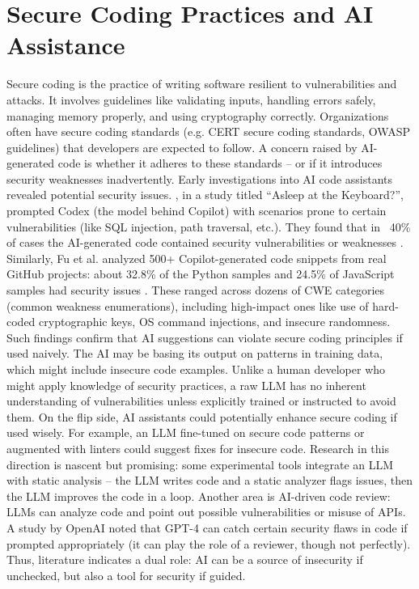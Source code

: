 \section{Secure Coding Practices and AI Assistance}
\label{sec:secure-coding-practices-and-ai-assistance}
Secure coding is the practice of writing software resilient to vulnerabilities and attacks. It involves guidelines like validating inputs, handling errors safely, managing memory properly, and using cryptography correctly. Organizations often have secure coding standards (e.g. CERT secure coding standards, OWASP guidelines) that developers are expected to follow. A concern raised by AI-generated code is whether it adheres to these standards – or if it introduces security weaknesses inadvertently.
Early investigations into AI code assistants revealed potential security issues. \autocite{Pearce2022}, in a study titled “Asleep at the Keyboard?”, prompted Codex (the model behind Copilot) with scenarios prone to certain vulnerabilities (like SQL injection, path traversal, etc.). They found that in ~40\% of cases the AI-generated code contained security vulnerabilities or weaknesses \autocite{Pearce2022}. Similarly, Fu et al. analyzed 500+ Copilot-generated code snippets from real GitHub projects: about 32.8\% of the Python samples and 24.5\% of JavaScript samples had security issues \autocite{Fu2023}. These ranged across dozens of CWE categories (common weakness enumerations), including high-impact ones like use of hard-coded cryptographic keys, OS command injections, and insecure randomness​. Such findings confirm that AI suggestions can violate secure coding principles if used naively. The AI may be basing its output on patterns in training data, which might include insecure code examples. Unlike a human developer who might apply knowledge of security practices, a raw LLM has no inherent understanding of vulnerabilities unless explicitly trained or instructed to avoid them.
On the flip side, AI assistants could potentially enhance secure coding if used wisely. For example, an LLM fine-tuned on secure code patterns or augmented with linters could suggest fixes for insecure code. Research in this direction is nascent but promising: some experimental tools integrate an LLM with static analysis – the LLM writes code and a static analyzer flags issues, then the LLM improves the code in a loop. Another area is AI-driven code review: LLMs can analyze code and point out possible vulnerabilities or misuse of APIs. A study by OpenAI noted that GPT-4 can catch certain security flaws in code if prompted appropriately (it can play the role of a reviewer, though not perfectly). Thus, literature indicates a dual role: AI can be a source of insecurity if unchecked, but also a tool for security if guided.

